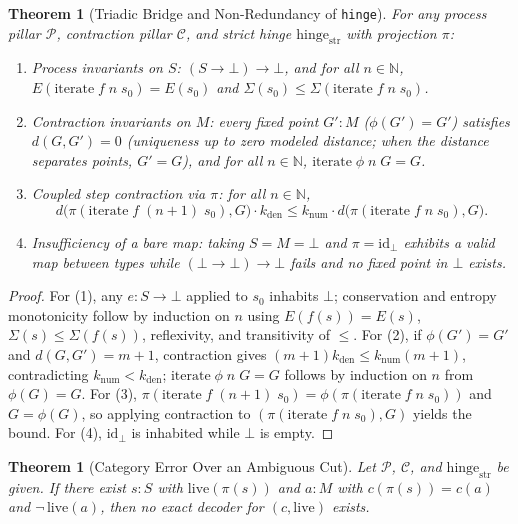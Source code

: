 \documentclass[12pt,a4paper]{article}
\newtheorem{theorem}[thm]{Theorem}
\begin{document}
\begin{theorem}[Triadic Bridge and Non-Redundancy of \texttt{hinge}]
\label{thm:triadic-bridge}
For any process pillar $\mathcal{P}$, contraction pillar $\mathcal{C}$, and strict hinge $\mathrm{hinge}_{\mathrm{str}}$ with projection $\pi$:
\begin{enumerate}
  \item \emph{Process invariants on $S$:} $(S \to \bot) \to \bot$, and for all $n \in \mathbb{N}$, $E(\mathrm{iterate}\;f\;n\;s_0) = E(s_0)$ and $\Sigma(s_0) \le \Sigma(\mathrm{iterate}\;f\;n\;s_0)$.
  \item \emph{Contraction invariants on $M$:} every fixed point $G' : M$ ($\phi(G') = G'$) satisfies $d(G, G') = 0$ (uniqueness up to zero modeled distance; when the distance separates points, $G' = G$), and for all $n \in \mathbb{N}$, $\mathrm{iterate}\;\phi\;n\;G = G$.
  \item \emph{Coupled step contraction via $\pi$:} for all $n \in \mathbb{N}$,
  \[
  d\bigl(\pi(\mathrm{iterate}\;f\;(n+1)\;s_0), G\bigr) \cdot k_{\mathrm{den}} \le k_{\mathrm{num}} \cdot d\bigl(\pi(\mathrm{iterate}\;f\;n\;s_0), G\bigr).
  \]
  \item \emph{Insufficiency of a bare map:} taking $S = M = \bot$ and $\pi = \mathrm{id}_\bot$ exhibits a valid map between types while $(\bot \to \bot) \to \bot$ fails and no fixed point in $\bot$ exists.
\end{enumerate}
\end{theorem}

\begin{proof}
For (1), any $e : S \to \bot$ applied to $s_0$ inhabits $\bot$; conservation and entropy monotonicity follow by induction on $n$ using $E(f(s)) = E(s)$, $\Sigma(s) \le \Sigma(f(s))$, reflexivity, and transitivity of $\le$. For (2), if $\phi(G') = G'$ and $d(G, G') = m + 1$, contraction gives $(m+1)k_{\mathrm{den}} \le k_{\mathrm{num}}(m+1)$, contradicting $k_{\mathrm{num}} < k_{\mathrm{den}}$; $\mathrm{iterate}\;\phi\;n\;G = G$ follows by induction on $n$ from $\phi(G) = G$. For (3), $\pi(\mathrm{iterate}\;f\;(n+1)\;s_0) = \phi(\pi(\mathrm{iterate}\;f\;n\;s_0))$ and $G = \phi(G)$, so applying contraction to $(\pi(\mathrm{iterate}\;f\;n\;s_0), G)$ yields the bound. For (4), $\mathrm{id}_\bot$ is inhabited while $\bot$ is empty.
\end{proof}

\begin{theorem}[Category Error Over an Ambiguous Cut]
\label{thm:category-error}
Let $\mathcal{P}$, $\mathcal{C}$, and $\mathrm{hinge}_{\mathrm{str}}$ be given. If there exist $s : S$ with $\mathrm{live}(\pi(s))$ and $a : M$ with $c(\pi(s)) = c(a)$ and $\neg\,\mathrm{live}(a)$, then no exact decoder for $(c, \mathrm{live})$ exists.
\end{theorem}
\end{document}
